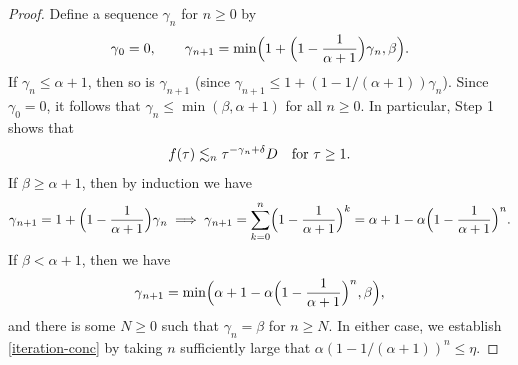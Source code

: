 \documentclass[10pt, reqno]{amsart}
\begin{document}
\begin{proof}
 Define a sequence \(\gamma_n\) for \(n\ge 0\) by
\begin{equation}
\gamma{}_0=0,\qquad \gamma{}_{n+1} = \min \Bigl(1 + \Bigl(1-\frac{1}{\alpha{}+1}\Bigr)\gamma{}_n,\beta{}\Bigr).
\end{equation}
If \(\gamma_n\le \alpha{} + 1\), then so is \(\gamma_{n + 1}\) (since \(\gamma_{n + 1}\le 1 + (1-1/(\alpha{} +
1))\gamma_n\)). Since \(\gamma_0 = 0\), it follows that \(\gamma_n\le \min (\beta{},\alpha{} +
1)\) for all \(n\ge 0\). In particular, Step 1 shows that
\begin{equation}
f(\tau{})\lesssim_n \tau^{-\gamma{}_n+\delta{}}D\quad \textnormal{for }\tau{}\ge 1.
\end{equation}
If \(\beta{}\ge \alpha{} + 1\), then by induction we have
\begin{equation}
\gamma{}_{n+1} = 1 + \Bigl(1-\frac{1}{\alpha{}+1}\Bigr)\gamma{}_n\implies \gamma{}_{n+1} = \sum_{k=0}^n\Bigl(1-\frac{1}{\alpha{}+1}\Bigr)^k = \alpha{}+1-\alpha{}\Bigl(1-\frac{1}{\alpha{}+1}\Bigr)^n.
\end{equation}
If \(\beta{}<\alpha{} + 1\), then we have
\begin{equation}
\gamma{}_{n+1} = \min \Bigl(\alpha{}+1-\alpha{}\Bigl(1-\frac{1}{\alpha{}+1}\Bigr)^n,\beta{}\Bigr),
\end{equation}
and there is some \(N\ge 0\) such that \(\gamma_n=\beta{}\) for \(n\ge N\). In either case, we
establish \cref{iteration-conc} by taking \(n\) sufficiently large that
\(\alpha{}(1-1/(\alpha{} + 1))^n \le \eta{}\).
\end{proof}
\end{document}
